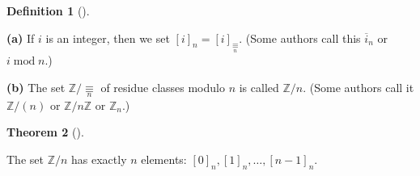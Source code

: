 \documentclass[numbers=enddot,12pt,final,onecolumn,notitlepage]{scrartcl}%
\numberwithin{exer}{subsection}
\theoremstyle{definition}
\newtheorem{theo}{Theorem}[subsection]
\newenvironment{theorem}[1][]
{\begin{theo}[#1]\begin{leftbar}}
{\end{leftbar}\end{theo}}
\newtheorem{defi}[theo]{Definition}
\newenvironment{definition}[1][]
{\begin{defi}[#1]\begin{leftbar}}
{\end{leftbar}\end{defi}}
\begin{document}
\begin{definition}
\textbf{(a)} If $i$ is an integer, then we set $\left[  i\right]  _{n}=\left[
i\right]  _{\underset{n}{\equiv}}$. (Some authors call this $\overline{i}_{n}$
or $i\operatorname{mod}n$.)

\textbf{(b)} The set $\mathbb{Z}/\underset{n}{\equiv}$ of residue classes
modulo $n$ is called $\mathbb{Z}/n$. (Some authors call it $\mathbb{Z}/\left(
n\right)  $ or $\mathbb{Z}/n\mathbb{Z}$ or $\mathbb{Z}_{n}$.)
\end{definition}

\begin{theorem}
The set $\mathbb{Z}/n$ has exactly $n$ elements: $\left[  0\right]
_{n},\left[  1\right]  _{n},\ldots,\left[  n-1\right]  _{n}$.
\end{theorem}
\end{document}
